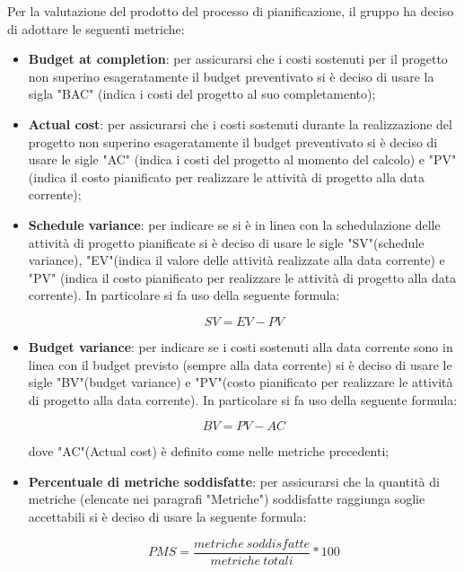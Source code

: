Per la valutazione del prodotto del processo di pianificazione, il gruppo ha deciso di adottare le seguenti metriche:
\begin{itemize}
\item \textbf{Budget at completion}: per assicurarsi che i costi sostenuti per il progetto non superino esageratamente il budget preventivato si è deciso di usare la sigla "BAC" (indica i costi del progetto al suo completamento);
\item \textbf{Actual cost}: per assicurarsi che i costi sostenuti durante la realizzazione del progetto non superino esageratamente il budget preventivato si è deciso di usare le sigle "AC" (indica i costi del progetto al momento del calcolo) e "PV" (indica il costo pianificato per realizzare le attività di progetto alla data corrente);
\item \textbf{Schedule variance}: per indicare se si è in linea con la schedulazione delle attività di progetto pianificate si è deciso di usare le sigle "SV"(schedule variance), "EV"(indica il valore delle attività realizzate alla data corrente) e "PV" (indica il costo pianificato per realizzare le attività di progetto alla data corrente). In particolare si fa uso della seguente formula: \vspace{-0.5cm}
\begin{center}
\[SV=EV-PV\]
\end{center}
\item \textbf{Budget variance}: per indicare se i costi sostenuti alla data corrente sono in linea con il budget previsto (sempre alla data corrente) si è deciso di usare le sigle "BV"(budget variance) e "PV"(costo pianificato per realizzare le attività di progetto alla data corrente).  In particolare si fa uso della seguente formula: \vspace{-0.5cm}
\begin{center}
\[BV=PV-AC\]
\end{center}
dove "AC"(Actual cost) è definito come nelle metriche precedenti;
\item \textbf{Percentuale di metriche soddisfatte}: per assicurarsi che la quantità di metriche (elencate nei paragrafi "Metriche") soddisfatte raggiunga soglie accettabili si è deciso di usare la seguente formula:
\begin{center}
\[PMS=\frac{metriche \ soddisfatte}{metriche \ totali}*100\]
\end{center}
\end{itemize}


